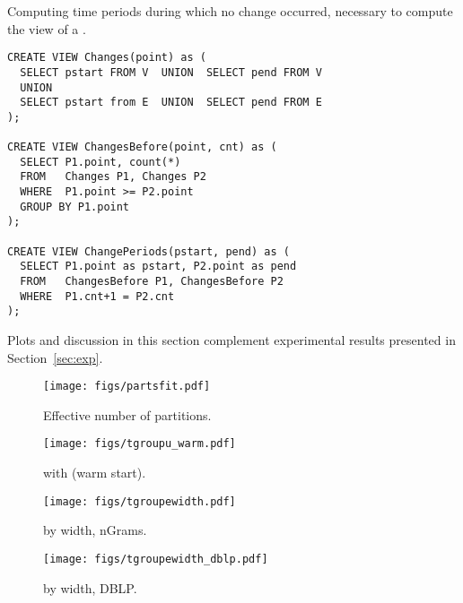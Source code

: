 \appendix \label{sec:app1}

Computing time periods during which no change occurred, necessary to
compute the \rgs view of a \tg.

\begin{small}
\begin{verbatim}
CREATE VIEW Changes(point) as (
  SELECT pstart FROM V  UNION  SELECT pend FROM V
  UNION
  SELECT pstart from E  UNION  SELECT pend FROM E
);

CREATE VIEW ChangesBefore(point, cnt) as (
  SELECT P1.point, count(*)
  FROM   Changes P1, Changes P2
  WHERE  P1.point >= P2.point
  GROUP BY P1.point
);

CREATE VIEW ChangePeriods(pstart, pend) as (
  SELECT P1.point as pstart, P2.point as pend
  FROM   ChangesBefore P1, ChangesBefore P2
  WHERE  P1.cnt+1 = P2.cnt
);
\end{verbatim}
\end{small}

\appendix \label{sec:app2}

Plots and discussion in this section complement experimental results
presented in Section~\ref{sec:exp}.

\begin{figure*}[t]
\centering
\begin{minipage}{3in}
  \centering
  \texttt{[image: figs/partsfit.pdf]}
\vspace{-0.1in}
  \caption{Effective number of partitions.}
  \label{fig:partsfit}
\vspace{-0.1in}
\end{minipage}
\begin{minipage}{3in}
  \centering
  \texttt{[image: figs/tgroupu\_warm.pdf]}
\vspace{-0.1in}
  \caption{ with  (warm start).}
  \label{fig:tgroupu}
\vspace{-0.1in}
\end{minipage}
\end{figure*}

\begin{figure*}[t]
\centering
\begin{minipage}{3in}
  \centering
  \texttt{[image: figs/tgroupewidth.pdf]}
\vspace{-0.1in}
  \caption{ by width, nGrams.}
  \label{fig:tgroup_width}
\vspace{-0.1in}
\end{minipage}
\begin{minipage}{3in}
  \centering
  \texttt{[image: figs/tgroupewidth\_dblp.pdf]}
\vspace{-0.1in}
  \caption{ by width, DBLP.}
  \label{fig:tgroup_width_dblp}
\vspace{-0.1in}
\end{minipage}
\end{figure*}

